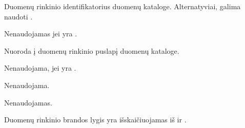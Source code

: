 \documentclass[letterpaper,10pt,lithuanian]{sphinxmanual}
\begin{document}

\begin{fulllineitems}
\label{\detokenize{dimensijos:dataset.ref}}
\pysigstartsignatures
\pysigline
{}
\pysigstopsignatures
\sphinxAtStartPar
Duomenų rinkinio identifikatorius duomenų kataloge. Alternatyviai, galima
naudoti {\hyperref[\detokenize{dimensijos:dataset.source}]{}}.

\sphinxAtStartPar
Nenaudojamas jei {\hyperref[\detokenize{dimensijos:dataset.type}]{}} yra .

\end{fulllineitems}


\begin{fulllineitems}
\label{\detokenize{dimensijos:dataset.source}}
\pysigstartsignatures
\pysigline
{}
\pysigstopsignatures
\sphinxAtStartPar
Nuoroda į duomenų rinkinio puslapį duomenų kataloge.

\sphinxAtStartPar
Nenaudojama, jei  yra .

\end{fulllineitems}


\begin{fulllineitems}
\label{\detokenize{dimensijos:dataset.prepare}}
\pysigstartsignatures
\pysigline
{}
\pysigstopsignatures
\sphinxAtStartPar
Nenaudojama.

\end{fulllineitems}


\begin{fulllineitems}
\label{\detokenize{dimensijos:dataset.level}}
\pysigstartsignatures
\pysigline
{}
\pysigstopsignatures
\sphinxAtStartPar
Nenaudojamas.

\sphinxAtStartPar
Duomenų rinkinio brandos lygis yra išskaičiuojamas iš {\hyperref[\detokenize{dimensijos:model.level}]{}}
ir {\hyperref[\detokenize{dimensijos:property.level}]{}}.

\end{fulllineitems}
\end{document}
